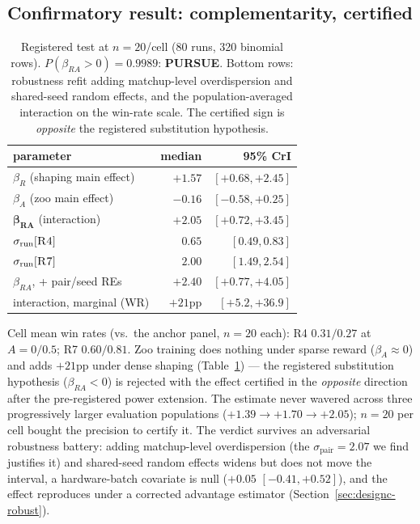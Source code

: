 \documentclass[letterpaper]{article}
\begin{document}
\subsection{Confirmatory result: complementarity, certified}
\label{sec:designc-confirm}

\begin{table}[t]
\centering
\small
\begin{tabular}{lrr}
\toprule
parameter & median & 95\% CrI \\
\midrule
$\beta_R$ (shaping main effect) & $+1.57$ & $[+0.68,+2.45]$ \\
$\beta_A$ (zoo main effect) & $-0.16$ & $[-0.58,+0.25]$ \\
$\boldsymbol{\beta_{RA}}$ (interaction) & $\boldsymbol{+2.05}$ & $\boldsymbol{[+0.72,+3.45]}$ \\
$\sigma_{\text{run}}[\textsc{R4}]$ & $0.65$ & $[0.49,0.83]$ \\
$\sigma_{\text{run}}[\textsc{R7}]$ & $2.00$ & $[1.49,2.54]$ \\
\midrule
$\beta_{RA}$, + pair/seed REs & $+2.40$ & $[+0.77,+4.05]$ \\
interaction, marginal (WR) & $+21$pp & $[+5.2,+36.9]$ \\
\bottomrule
\end{tabular}
\caption{Registered test at $n{=}20$/cell (80 runs, 320 binomial
rows). $P(\beta_{RA}>0)=0.9989$: \textbf{PURSUE}. Bottom rows:
robustness refit adding matchup-level overdispersion and shared-seed
random effects, and the population-averaged interaction on the
win-rate scale. The certified sign is \emph{opposite} the registered
substitution hypothesis.}
\label{tab:designc-confirm}
\end{table}

Cell mean win rates (vs.\ the anchor panel, $n{=}20$ each):
\textsc{R4} $0.31/0.27$ at $A{=}0/0.5$; \textsc{R7} $0.60/0.81$.
Zoo training does nothing under sparse reward ($\beta_A\approx 0$) and
adds $+21$pp under dense shaping
(Table~\ref{tab:designc-confirm}) --- the registered substitution
hypothesis ($\beta_{RA}<0$) is rejected with the effect certified in
the \emph{opposite} direction after the pre-registered power
extension.
The estimate never wavered across three progressively larger
evaluation populations ($+1.39\to+1.70\to+2.05$); $n{=}20$ per cell
bought the precision to certify it.
The verdict survives an adversarial robustness battery: adding
matchup-level overdispersion (the $\sigma_{\text{pair}}=2.07$ we find
justifies it) and shared-seed random effects widens but does not move
the interval, a hardware-batch covariate is null ($+0.05$
$[-0.41,+0.52]$), and the effect reproduces under a corrected
advantage estimator (Section~\ref{sec:designc-robust}).
\end{document}
